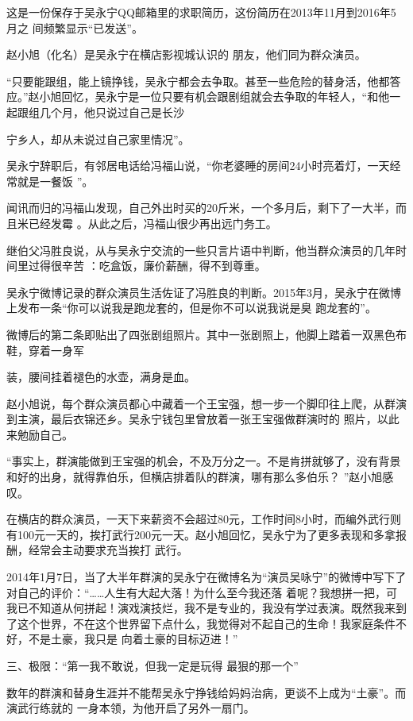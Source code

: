 \documentclass{article}
\begin{document}
这是一份保存于吴永宁QQ邮箱里的求职简历，这份简历在2013年11月到2016年5月之
间频繁显示“已发送”。 

赵小旭（化名）是吴永宁在横店影视城认识的
朋友，他们同为群众演员。 

“只要能跟组，能上镜挣钱，吴永宁都会去争取。甚至一些危险的替身活，他都答应。”赵小旭回忆，吴永宁是一位只要有机会跟剧组就会去争取的年轻人，“和他一起跟组几个月，他只说过自己是长沙
\newpage

宁乡人，却从未说过自己家里情况”。 

吴永宁辞职后，有邻居电话给冯福山说，“你老婆睡的房间24小时亮着灯，一天经常就是一餐饭
”。 

闻讯而归的冯福山发现，自己外出时买的20斤米，一个多月后，剩下了一大半，而且米已经发霉
。从此之后，冯福山很少再出远门务工。 

继伯父冯胜良说，从与吴永宁交流的一些只言片语中判断，他当群众演员的几年时间里过得很辛苦
：吃盒饭，廉价薪酬，得不到尊重。 

吴永宁微博记录的群众演员生活佐证了冯胜良的判断。2015年3月，吴永宁在微博上发布一条“你可以说我是跑龙套的，但是你不可以说我说是臭
跑龙套的”。 

微博后的第二条即贴出了四张剧组照片。其中一张剧照上，他脚上踏着一双黑色布鞋，穿着一身军
\newpage

装，腰间挂着褪色的水壶，满身是血。 

赵小旭说，每个群众演员都心中藏着一个王宝强，想一步一个脚印往上爬，从群演到主演，最后衣锦还乡。吴永宁钱包里曾放着一张王宝强做群演时的
照片，以此来勉励自己。 

“事实上，群演能做到王宝强的机会，不及万分之一。不是肯拼就够了，没有背景和好的出身，就得靠伯乐，但横店排着队的群演，哪有那么多伯乐？
”赵小旭感叹。 

在横店的群众演员，一天下来薪资不会超过80元，工作时间8小时，而编外武行则有100元一天的，挨打武行200元一天。赵小旭回忆，吴永宁为了更多表现和多拿报酬，经常会主动要求充当挨打
武行。 

2014年1月7日，当了大半年群演的吴永宁在微博名为“演员吴咏宁”的微博中写下了对自己的评价：“……人生有大起大落！为什么至今我还落
\newpage
着呢？我想拼一把，可我已不知道从何拼起！演戏演技烂，我不是专业的，我没有学过表演。既然我来到了这个世界，不在这个世界留下点什么，我觉得对不起自己的生命！我家庭条件不好，不是土豪，我只是
向着土豪的目标迈进！” 

三、极限：“第一我不敢说，但我一定是玩得
最狠的那一个” 

数年的群演和替身生涯并不能帮吴永宁挣钱给妈妈治病，更谈不上成为“土豪”。而演武行练就的
一身本领，为他开启了另外一扇门。 
\end{document}
